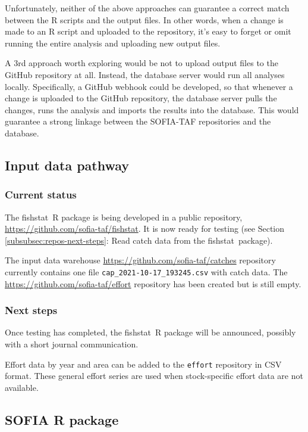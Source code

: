 \documentclass[12pt]{article}
\newcommand\blue[1]{\textcolor{darkblue}{#1}}
\newcommand\fishstat{{\sf fishstat}}
\begin{document}
Unfortunately, neither of the above approaches can guarantee a correct match
between the R scripts and the output files. In other words, when a change is
made to an R script and uploaded to the repository, it's easy to forget or omit
running the entire analysis and uploading new output files.

A 3rd approach worth exploring would be not to upload output files to the GitHub
repository at all. Instead, the database server would run all analyses locally.
Specifically, a GitHub webhook could be developed, so that whenever a change is
uploaded to the GitHub repository, the database server pulls the changes, runs
the analysis and imports the results into the database. This would guarantee a
strong linkage between the SOFIA-TAF repositories and the database.

\subsection{Input data pathway}

\subsubsection{Current status}

The \fishstat\ R package is being developed in a public repository,
\blue{\url{https://github.com/sofia-taf/fishstat}}. It is now ready for testing
(see Section \ref{subsubsec:repos-next-steps}: Read catch data from the
\fishstat\ package).

The input data warehouse \blue{\url{https://github.com/sofia-taf/catches}}
repository currently contains one file \verb|cap_2021-10-17_193245.csv| with
catch data. The \blue{\url{https://github.com/sofia-taf/effort}} repository has
been created but is still empty.

\newpage

\subsubsection{Next steps}

Once testing has completed, the \fishstat\ R package will be announced, possibly
with a short journal communication.

Effort data by year and area can be added to the \verb|effort| repository in CSV
format. These general effort series are used when stock-specific effort data are
not available.

\subsection{SOFIA R package}
\end{document}
